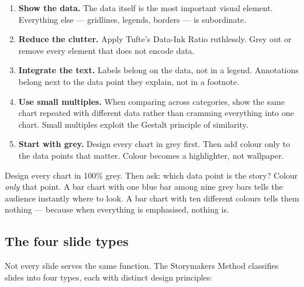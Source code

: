 \begin{enumerate}
  \item \textbf{Show the data.} The data itself is the most important visual element. Everything else --- gridlines, legends, borders --- is subordinate.
  \item \textbf{Reduce the clutter.} Apply Tufte's Data-Ink Ratio ruthlessly. Grey out or remove every element that does not encode data.
  \item \textbf{Integrate the text.} Labels belong on the data, not in a legend. Annotations belong next to the data point they explain, not in a footnote.
  \item \textbf{Use small multiples.} When comparing across categories, show the same chart repeated with different data rather than cramming everything into one chart. Small multiples exploit the Gestalt principle of similarity.
  \item \textbf{Start with grey.} Design every chart in grey first. Then add colour only to the data points that matter. Colour becomes a highlighter, not wallpaper.
\end{enumerate}

\begin{keybox}
Design every chart in 100\% grey. Then ask: which data point is the story? Colour \emph{only} that point. A bar chart with one blue bar among nine grey bars tells the audience instantly where to look. A bar chart with ten different colours tells them nothing --- because when everything is emphasised, nothing is.
\end{keybox}


\subsection{The four slide types}

Not every slide serves the same function. The Storymakers Method classifies slides into four types, each with distinct design principles:

